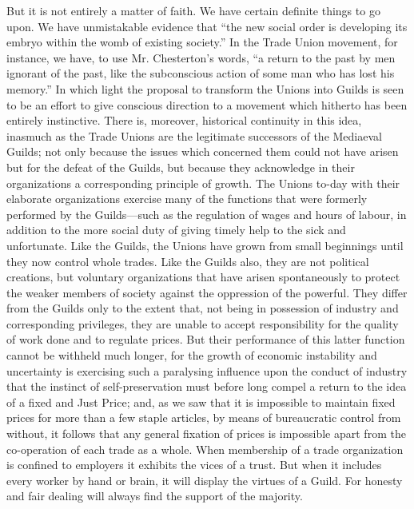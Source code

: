 \documentclass{book}
\begin{document}
But it is not entirely a matter of faith. We have certain definite things to go upon. We have unmistakable evidence that “the new social order is developing its embryo within the womb of existing society.” In the Trade Union movement, for instance, we have, to use Mr. Chesterton’s words, “a return to the past by men ignorant of the past, like the subconscious action of some man who has lost his memory.” In which light the proposal to transform the Unions into Guilds is seen to be an effort to give conscious direction to a movement which hitherto has been entirely instinctive. There is, moreover, historical continuity in this idea, inasmuch as the Trade Unions are the legitimate successors of the Mediaeval Guilds; not only because the issues which concerned them could not have arisen but for the defeat of the Guilds, but because they acknowledge in their organizations a corresponding principle of growth. The Unions to-day with their elaborate organizations exercise many of the functions that were formerly performed by the Guilds—such as the regulation of wages and hours of labour, in addition to the more social duty of giving timely help to the sick and unfortunate. Like the Guilds, the Unions have grown from small beginnings until they now control whole trades. Like the Guilds also, they are not political creations, but voluntary organizations that have arisen spontaneously to protect the weaker members of society against the oppression of the powerful. They differ from the Guilds only to the extent that, not being in possession of industry and corresponding privileges, they are unable to accept responsibility for the quality of work done and to regulate prices. But their performance of this latter function cannot be withheld much longer, for the growth of economic instability and uncertainty is exercising such a paralysing influence upon the conduct of industry that the instinct of self-preservation must before long compel a return to the idea of a fixed and Just Price; and, as we saw that it is impossible to maintain fixed prices for more than a few staple articles, by means of bureaucratic control from without, it follows that any general fixation of prices is impossible apart from the co-operation of each trade as a whole. When membership of a trade organization is confined to employers it exhibits the vices of a trust. But when it includes every worker by hand or brain, it will display the virtues of a Guild. For honesty and fair dealing will always find the support of the majority.
\end{document}
